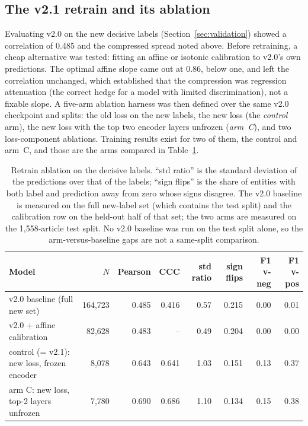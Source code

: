\documentclass[11pt,letterpaper]{article}
\begin{document}
\subsection{The v2.1 retrain and its ablation}
\label{sec:retrain}

Evaluating v2.0 on the new decisive labels (Section~\ref{sec:validation}) showed a correlation of
0.485 and the compressed spread noted above. Before retraining, a cheap alternative was tested:
fitting an affine or isotonic calibration to v2.0's own predictions. The optimal affine slope came
out at 0.86, below one, and left the correlation unchanged, which established that the compression
was regression attenuation (the correct hedge for a model with limited discrimination), not a
fixable slope. A five-arm ablation harness was then defined over the same v2.0 checkpoint and
splits: the old loss on the new labels, the new loss (the \emph{control} arm), the new loss with
the top two encoder layers unfrozen (\emph{arm~C}), and two loss-component ablations. Training
results exist for two of them, the control and arm~C, and those are the arms compared in
Table~\ref{tab:ablation}.

\begin{table}[H]
\centering\footnotesize
\setlength{\tabcolsep}{4pt}
\begin{tabular}{@{}lrrrrrrr@{}}
\toprule
\textbf{Model} & $N$ & Pearson & CCC & std ratio & sign flips & F1 v-neg & F1 v-pos \\
\midrule
v2.0 baseline (full new set) & 164{,}723 & 0.485 & 0.416 & 0.57 & 0.215 & 0.00 & 0.01 \\
v2.0 + affine calibration & 82{,}628 & 0.483 & -- & 0.49 & 0.204 & 0.00 & 0.00 \\
control (= v2.1): new loss, frozen encoder & 8{,}078 & 0.643 & 0.641 & 1.03 & 0.151 & 0.13 & 0.37 \\
arm C: new loss, top-2 layers unfrozen & 7{,}780 & 0.690 & 0.686 & 1.10 & 0.134 & 0.15 & 0.38 \\
\bottomrule
\end{tabular}
\caption{Retrain ablation on the decisive labels. ``std ratio'' is the standard deviation of the
predictions over that of the labels; ``sign flips'' is the share of entities with both label and
prediction away from zero whose signs disagree. The v2.0 baseline is measured on the full
new-label set (which contains the test split) and the calibration row on the held-out half of
that set; the two arms are measured on the 1{,}558-article test split. No v2.0 baseline was run
on the test split alone, so the arm-versus-baseline gaps are not a same-split comparison.}
\label{tab:ablation}
\end{table}
\end{document}
